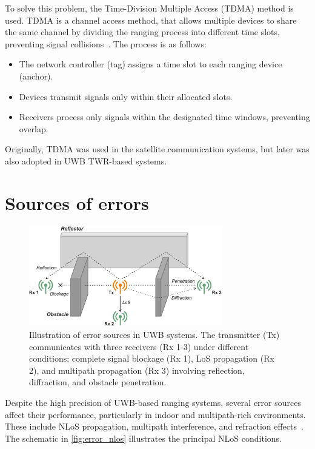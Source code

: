 To solve this problem, the Time-Division Multiple Access (TDMA) method is used. TDMA is a channel access method, that allows multiple devices to share the same channel by dividing the ranging process into different time slots, preventing signal collisions~\cite{falconer1995time, Yanjun2021TDMA}. The process is as follows:

\begin{itemize}
    \item The network controller (tag) assigns a time slot to each ranging device (anchor).
    \item Devices transmit signals only within their allocated slots.
    \item Receivers process only signals within the designated time windows, preventing overlap.
\end{itemize}

Originally, TDMA was used in the satellite communication systems, but later was also adopted in UWB TWR-based systems. 

\section{Sources of errors}\label{error_sources}

\begin{figure}[tbh]
\includegraphics[width=0.75\textwidth]{Figures/theoretical_background/obstacles.pdf}
\centering
\caption[Illustration of error sources in UWB systems.]{Illustration of error sources in UWB systems. The transmitter (Tx) communicates with three receivers (Rx 1-3) under different conditions: complete signal blockage (Rx 1), LoS propagation (Rx 2), and multipath propagation (Rx 3) involving reflection, diffraction, and obstacle penetration.}
\label{fig:error_nlos}
\end{figure}

Despite the high precision of UWB-based ranging systems, several error sources affect their performance, particularly in indoor and multipath-rich environments. These include NLoS propagation, multipath interference, and refraction effects~\cite{dardari2009ranging}. The schematic in \autoref{fig:error_nlos} illustrates the principal NLoS conditions.

